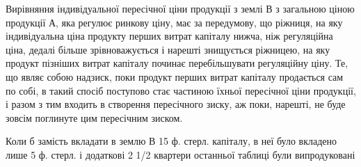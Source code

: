 Вирівняння індивідуальної пересічної ціни продукції з землі В з загальною
ціною продукції А, яка регулює ринкову ціну, має за передумову, що ріжниця,
на яку індивідуальна ціна продукту перших витрат капіталу нижча,
ніж регуляційна ціна, дедалі більше зрівноважується і нарешті знищується
ріжницею, на яку продукт пізніших витрат капіталу починає перебільшувати
регуляційну ціну. Те, що являє собою надзиск, поки продукт перших витрат
капіталу продається сам по собі, в такий спосіб поступово стає частиною їхньої
пересічної ціни продукції, і разом з тим входить в створення пересічного зиску,
аж поки, нарешті, не буде зовсім поглинуте цим пересічним зиском.

Коли б замість вкладати в землю В 15 ф. стерл. капіталу, в неї було вкладено
лише 5 ф. стерл. і додаткові 2  1/2 квартери останньої таблиці були випродуковані
\parbreak{}  %
